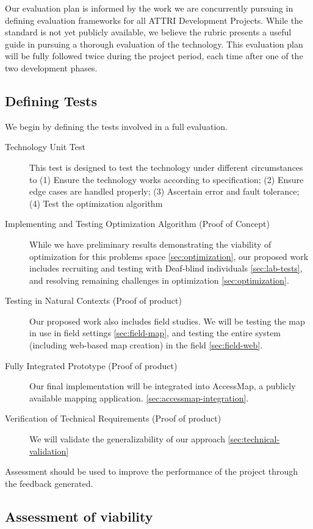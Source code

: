 
\label{sec:evaluation}

Our evaluation plan is informed by the work we are concurrently pursuing in defining evaluation frameworks for all ATTRI Development Projects. While the standard is not yet publicly available, we believe the rubric presents a useful guide in pursuing a thorough evaluation of the technology. This evaluation plan will be fully followed twice during the project period, each time after one of the two development phases.


\subsection{Defining Tests}
We begin by defining the tests involved in a full evaluation. 
\begin{description}
\item[Technology Unit Test]
This test is designed to test the technology under different circumstances to (1) Ensure the technology works according to specification; (2) Ensure edge cases are handled properly; (3) Ascertain error and fault tolerance; (4) Test the optimization algorithm
\item[]
\item[]
\item[]
\item[]
\item[]
\item[]
\item[]
\item[]

\end{description}
\begin{description}

\item[Implementing and Testing Optimization Algorithm (Proof of Concept)] While we have preliminary results demonstrating the viability of optimization for this problems space \ref{sec:optimization}, our proposed work includes recruiting and testing with Deaf-blind individuals \ref{sec:lab-tests}, and resolving remaining challenges in optimization \ref{sec:optimization}.
\item[Testing in Natural Contexts (Proof of product)] Our proposed work also includes field studies. We will be testing the map in use in field settings \ref{sec:field-map}, and testing the entire system (including web-based map creation) in the field \ref{sec:field-web}. 
\item[Fully Integrated Prototype (Proof of product)]
Our final implementation will be integrated into AccessMap, a publicly available mapping application. \ref{sec:accessmap-integration}.
\item[Verification of Technical Requirements (Proof of product)]
We will validate the generalizability of our approach  \ref{sec:technical-validation}
\end{description}


Assessment should be used to improve the performance of the project through the feedback generated.


\subsection{Assessment of viability}
